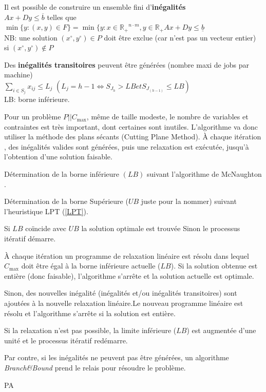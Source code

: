 \documentclass[a4paper,12pt]{report}
\theoremstyle{plain}				%
\theoremstyle{definition}				%
\newcommand\problemGrahamP{$P||C_{\max}$\xspace}
\begin{document}
Il est possible de construire un ensemble fini d'\textbf{inégalités} \\
$Ax+Dy \leq \overline{b}$ telles que \\
$\min \{y : (x,y) \in F \} = \min \{y : x \in \mathbb{R_+}^{n \cdot m}, y \in \mathbb{R_+} Ax+Dy \leq \underline{b}$ \\
NB: une solution
$(x \ensuremath{^\circ} , y\ensuremath{^\circ}) \in P$ doit être
exclue (car n'est pas un vecteur entier) si
$(x\ensuremath{^\circ}, y\ensuremath{^\circ}) \notin P $

\bigskip
Des \textbf{inégalités transitoires} peuvent être générées (nombre maxi de jobs par machine) \\
$\sum_{i \in S_j} x_{ij} \leq L_j$ \quad $(L_j = h-1 \iff S_{J_h} > LB et S_{J_{(h-1)}} \leq LB)$\\
LB: borne inférieure.

\bigskip

Pour un problème \problemGrahamP, même de taille modeste, le nombre de
variables et contraintes est très important, dont certaines sont
inutiles.
L'algorithme va donc utiliser la méthode des plans sécants (Cutting
Plane Method).
\`A chaque itération , des inégalités valides sont générées, puis une
relaxation est exécutée, jusqu'à l'obtention d'une solution faisable.

\bigskip
\begin{algorithm}[H]
\DontPrintSemicolon

Détermination de la borne inférieure $(LB)$ suivant l'algorithme de
McNaughton \cite{mcnaughton1959scheduling}.

\BlankLine %
Détermination de la borne Supérieure ($UB$ juste pour la nommer)
suivant l'heuristique LPT (\ref{LPT}).

\BlankLine %
Si $LB$ coïncide avec $UB$ la solution optimale est trouvée Sinon le
processus itératif démarre.

\BlankLine
À chaque itération un programme de relaxation linéaire est résolu dans
lequel $C_{\max}$ doit être égal à la borne inférieure actuelle
($LB$).
Si la solution obtenue est entière (donc faisable), l'algorithme
s'arrête et la solution actuelle est optimale.

\BlankLine
Sinon, des nouvelles inégalité (inégalités et/ou inégalités
transitoires) sont ajoutées à la nouvelle relaxation linéaire.Le
nouveau programme linéaire est résolu et l'algorithme s'arrête si la
solution est entière.

\BlankLine
Si la relaxation n'est pas possible, la limite inférieure ($LB$) est
augmentée d'une unité et le processus itératif redémarre.

\BlankLine
Par contre, si les inégalités ne peuvent pas être générées, un
algorithme \textit{Branch\&Bound} prend le relais pour résoudre le
problème.

\caption{PA\label{PA}}
\end{algorithm}
\end{document}
